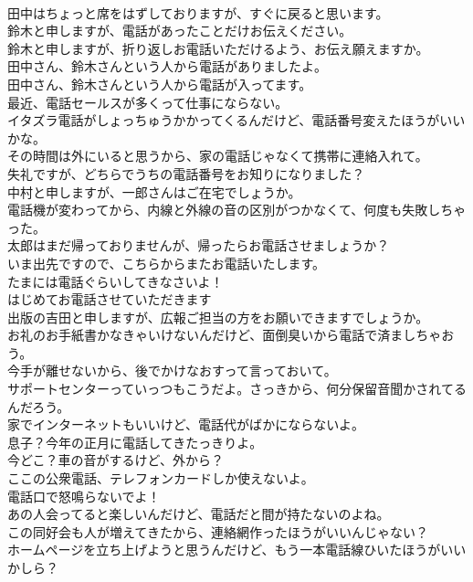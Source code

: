 \documentclass[8pt]{extreport}
\begin{document}
\begin{CJK}{UTF8}{min}
\\	田中はちょっと席をはずしておりますが、すぐに戻ると思います。	
\\	鈴木と申しますが、電話があったことだけお伝えください。	
\\	鈴木と申しますが、折り返しお電話いただけるよう、お伝え願えますか。	
\\	田中さん、鈴木さんという人から電話がありましたよ。	
\\	田中さん、鈴木さんという人から電話が入ってます。	
\\	最近、電話セールスが多くって仕事にならない。	
\\	イタズラ電話がしょっちゅうかかってくるんだけど、電話番号変えたほうがいいかな。	
\\	その時間は外にいると思うから、家の電話じゃなくて携帯に連絡入れて。	
\\	失礼ですが、どちらでうちの電話番号をお知りになりました？	
\\	中村と申しますが、一郎さんはご在宅でしょうか。	
\\	電話機が変わってから、内線と外線の音の区別がつかなくて、何度も失敗しちゃった。	
\\	太郎はまだ帰っておりませんが、帰ったらお電話させましょうか？	
\\	いま出先ですので、こちらからまたお電話いたします。	
\\	たまには電話ぐらいしてきなさいよ！	
\\	はじめてお電話させていただきます
\\	出版の吉田と申しますが、広報ご担当の方をお願いできますでしょうか。	
\\	お礼のお手紙書かなきゃいけないんだけど、面倒臭いから電話で済ましちゃおう。	
\\	今手が離せないから、後でかけなおすって言っておいて。	
\\	サポートセンターっていっつもこうだよ。さっきから、何分保留音聞かされてるんだろう。	
\\	家でインターネットもいいけど、電話代がばかにならないよ。	
\\	息子？今年の正月に電話してきたっきりよ。	
\\	今どこ？車の音がするけど、外から？	
\\	ここの公衆電話、テレフォンカードしか使えないよ。	
\\	電話口で怒鳴らないでよ！	
\\	あの人会ってると楽しいんだけど、電話だと間が持たないのよね。	
\\	この同好会も人が増えてきたから、連絡網作ったほうがいいんじゃない？	
\\	ホームページを立ち上げようと思うんだけど、もう一本電話線ひいたほうがいいかしら？	

\end{CJK}
\end{document}
